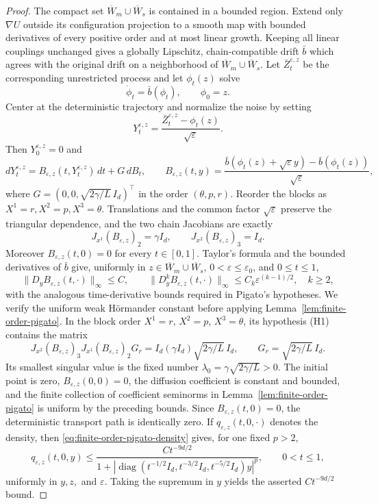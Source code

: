 \documentclass[11pt]{article}
\numberwithin{equation}{section}
\theoremstyle{plain}
\theoremstyle{definition}
\theoremstyle{remark}
\newcommand{\eps}{\varepsilon}
\begin{document}
\begin{proof}
The compact set $\overline W_m\cup\overline W_s$ is contained in a bounded
region.  Extend only $\nabla U$ outside its configuration projection to a
smooth map with bounded derivatives of every positive order and at most
linear growth.  Keeping all linear couplings unchanged gives a globally
Lipschitz, chain-compatible drift $\bar b$ which agrees with the original
drift on a neighborhood of $\overline W_m\cup\overline W_s$.  Let
$\bar Z_t^{\eps,z}$ be the corresponding unrestricted process and let
$\phi_t(z)$ solve 
\[
\dot\phi_t=\bar b(\phi_t), 
\qquad\phi_0=z.
\]
Center at the deterministic trajectory and normalize the noise by setting
\[
 Y_t^{\eps,z}=\frac{\bar Z_t^{\eps,z}-\phi_t(z)}{\sqrt\eps}.
\]
Then $Y_0^{\eps,z}=0$ and
\[
 dY_t^{\eps,z}=B_{\eps,z}(t,Y_t^{\eps,z})\,dt+G\,dB_t,
 \qquad
 B_{\eps,z}(t,y)
 =\frac{\bar b(\phi_t(z)+\sqrt\eps y)-\bar b(\phi_t(z))}{\sqrt\eps},
\]
where $G=(0,0,\sqrt{2\gamma/L}\,I_{d})^\top$ in the order
$(\theta,p,r)$.  Reorder the blocks as $X^1=r,X^2=p,X^3=\theta$.
Translations and the common factor $\sqrt\eps$ preserve the triangular
dependence, and the two chain Jacobians are exactly
\[
 J_{x^1}(B_{\eps,z})_2=\gamma I_{d},
 \qquad
 J_{x^2}(B_{\eps,z})_3=I_{d}.
\]
Moreover $B_{\eps,z}(t,0)=0$ for every $t\in[0,1]$.  Taylor's formula and the bounded derivatives of
$\bar b$ give, uniformly in $z\in\overline W_m\cup\overline W_s$,
$0<\eps\le\eps_0$, and $0\le t\le1$,
\[
 \|D_yB_{\eps,z}(t,\cdot)\|_\infty\le C,
 \qquad
 \|D_y^kB_{\eps,z}(t,\cdot)\|_\infty
 \le C_k\eps^{(k-1)/2},\quad k\ge2,
\]
with the analogous time-derivative bounds required in Pigato's hypotheses.
We verify the uniform weak H\"ormander constant before applying
Lemma~\ref{lem:finite-order-pigato}.
In the block order $X^1=r$, $X^2=p$, $X^3=\theta$, its hypothesis (H1)
contains the matrix
\[
J_{x^2}(B_{\eps,z})_3J_{x^1}(B_{\eps,z})_2G_r
=I_d(\gamma I_d)\sqrt{2\gamma/L}\,I_d,
\qquad
G_r=\sqrt{2\gamma/L}\,I_d.
\]
Its smallest singular value is the fixed number
$\lambda_0=\gamma\sqrt{2\gamma/L}>0$.  The initial point is zero,
$B_{\eps,z}(0,0)=0$, the diffusion coefficient is constant and bounded, and
the finite collection of coefficient seminorms in
Lemma~\ref{lem:finite-order-pigato} is uniform by the preceding bounds.  Since
$B_{\eps,z}(t,0)=0$, the deterministic transport path is identically zero.
If $q_{\eps,z}(t,0,\cdot)$ denotes the density, then
\eqref{eq:finite-order-pigato-density} gives, for one fixed $p>2$,
\[
q_{\eps,z}(t,0,y)
\le
\frac{Ct^{-9d/2}}
{1+|\operatorname{diag}
(t^{-1/2}I_d,t^{-3/2}I_d,t^{-5/2}I_d)y|^p},
\qquad 0<t\le1,
\]
uniformly in $y,z,$ and $\eps$.  Taking the supremum in $y$ yields the
asserted $Ct^{-9d/2}$ bound.


\end{proof}
\end{document}
